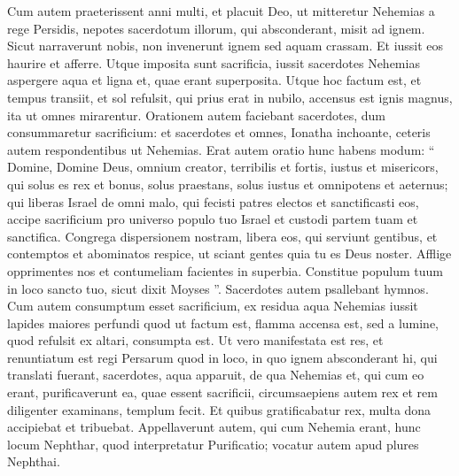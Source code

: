 \begin{biblechapter}
\verse Cum autem praeterissent anni multi, et placuit Deo, ut mitteretur Nehemias a rege Persidis, nepotes sacerdotum illorum, qui absconderant, misit ad ignem. 
\verse Sicut narraverunt nobis, non invenerunt ignem sed aquam crassam. Et iussit eos haurire et afferre. Utque imposita sunt sacrificia, iussit sacerdotes Nehemias aspergere aqua et ligna et, quae erant superposita. 
\verse Utque hoc factum est, et tempus transiit, et sol refulsit, qui prius erat in nubilo, accensus est ignis magnus, ita ut omnes mirarentur. 
\verse Orationem autem faciebant sacerdotes, dum consummaretur sacrificium: et sacerdotes et omnes, Ionatha inchoante, ceteris autem respondentibus ut Nehemias.
 \verse Erat autem oratio hunc habens modum: “ Domine, Domine Deus, omnium creator, terribilis et fortis, iustus et misericors, qui solus es rex et bonus, 
\verse solus praestans, solus iustus et omnipotens et aeternus; qui liberas Israel de omni malo, qui fecisti patres electos et sanctificasti eos, 
\verse accipe sacrificium pro universo populo tuo Israel et custodi partem tuam et sanctifica. 
 \verse Congrega dispersionem nostram, libera eos, qui serviunt gentibus, et contemptos et abominatos respice, ut sciant gentes quia tu es Deus noster. 
 \verse Afflige opprimentes nos et contumeliam facientes in superbia. 
\verse Constitue populum tuum in loco sancto tuo, sicut dixit Moyses ”. 
\verse Sacerdotes autem psallebant hymnos. 
\verse Cum autem consumptum esset sacrificium, ex residua aqua Nehemias iussit lapides maiores perfundi 
\verse quod ut factum est, flamma accensa est, sed a lumine, quod refulsit ex altari, consumpta est. 
\verse Ut vero manifestata est res, et renuntiatum est regi Persarum quod in loco, in quo ignem absconderant hi, qui translati fuerant, sacerdotes, aqua apparuit, de qua Nehemias et, qui cum eo erant, purificaverunt ea, quae essent sacrificii, 
\verse circumsaepiens autem rex et rem diligenter examinans, templum fecit. 
\verse Et quibus gratificabatur rex, multa dona accipiebat et tribuebat. 
\verse Appellaverunt autem, qui cum Nehemia erant, hunc locum Nephthar, quod interpretatur Purificatio; vocatur autem apud plures Nephthai.
 

\end{biblechapter}
